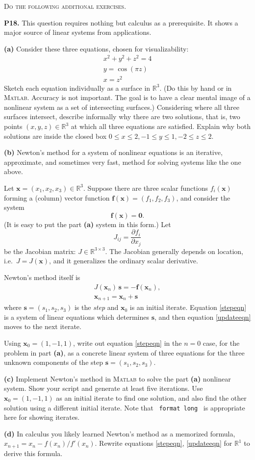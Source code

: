 \documentclass[12pt]{amsart}
\newcommand{\bbf}{\mathbf{f}}
\newcommand{\bs}{\mathbf{s}}
\newcommand{\bx}{\mathbf{x}}
\newcommand{\bzero}{\bm{0}}
\newcommand{\RR}{\mathbb{R}}
\newcommand{\prob}[1]{\bigskip\noindent\textbf{#1.}\quad }
\newcommand{\epart}[1]{\medskip\noindent\textbf{(#1)}\quad }
\newcommand{\Matlab}{\textsc{Matlab}\xspace}
\begin{document}
\bigskip
\noindent \textsc{Do the following additional exercises.}

\medskip

\prob{P18}  This question requires nothing but calculus as a prerequisite.  It shows a major source of linear systems from applications.

\epart{a}  Consider these three equations, chosen for visualizability:
\begin{gather*}
x^2+y^2+z^2 = 4 \\
y = \cos(\pi z) \\
x = z^2
\end{gather*}
Sketch each equation individually as a surface in $\RR^3$.  (Do this by hand or in \Matlab.  Accuracy is not important.  The goal is to have a clear mental image of a nonlinear system as a set of intersecting surfaces.)  Considering where all three surfaces intersect, describe informally why there are two solutions, that is, two points $(x,y,z)\in\RR^3$ at which all three equations are satisfied.  Explain why both solutions are inside the closed box $0\le x \le 2, -1\le y \le 1, -2\le z \le 2$.

\epart{b}  Newton's method for a system of nonlinear equations is an iterative, approximate, and sometimes very fast, method for solving systems like the one above.

Let $\bx=(x_1,x_2,x_3)\in\RR^3$.  Suppose there are three scalar functions $f_i(\bx)$ forming a (column) vector function $\bbf(\bx)=(f_1,f_2,f_3)$, and consider the system
    $$\bbf(\bx)=\bzero.$$
(It is easy to put the part \textbf{(a)} system in this form.)  Let
	$$J_{ij} = \frac{\partial f_i}{\partial x_j}$$
be the Jacobian matrix: $J\in\RR^{3\times 3}$.  The Jacobian generally depends on location, i.e.~$J=J(\bx)$, and it generalizes the ordinary scalar derivative.

Newton's method itself is
\begin{gather}
J(\bx_n)\, \bs = - \bbf(\bx_n), \label{stepeqn} \\
\bx_{n+1} = \bx_n + \bs \label{updateeqn}
\end{gather}
where $\bs=(s_1,s_2,s_3)$ is the \emph{step} and $\bx_0$ is an initial iterate.  Equation \eqref{stepeqn} is a system of linear equations which determines $\bs$, and then equation \eqref{updateeqn} moves to the next iterate.

Using $\bx_0=(1,-1,1)$, write out equation \eqref{stepeqn} in the $n=0$ case, for the problem in part \textbf{(a)}, as a concrete linear system of three equations for the three unknown components of the step $\bs = (s_1,s_2,s_3)$.

\epart{c}  Implement Newton's method in \Matlab to solve the part \textbf{(a)} nonlinear system.  Show your script and generate at least five iterations.  Use $\bx_0=(1,-1,1)$ as an initial iterate to find one solution, and also find the other solution using a different initial iterate.  Note that \, \texttt{format long} \, is appropriate here for showing iterates.

\epart{d}  In calculus you likely learned Newton's method as a memorized formula, $x_{n+1} = x_n - f(x_n)/f'(x_n)$.  Rewrite equations \eqref{stepeqn}, \eqref{updateeqn} for $\RR^1$ to derive this formula.
\end{document}
